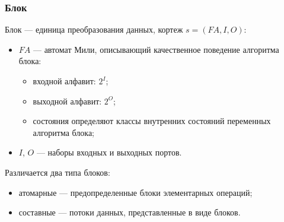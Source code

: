 \documentclass[10pt,pdf,hyperref={unicode}]{beamer}
\newcommand{\FA}{F\!A}
\begin{document}
\begin{frame}
  \frametitle{Блок}
  Блок --- единица преобразования данных, кортеж $s = (\FA, I, O)$:
  \begin{itemize}
    \item $\FA$ --- автомат Мили, описывающий качественное поведение алгоритма блока:
      \begin{itemize}
        \item входной алфавит: $2^I$;
        \item выходной алфавит: $2^O$;
        \item состояния определяют классы внутренних состояний переменных
              алгоритма блока;
      \end{itemize}
    \item $I$, $O$ --- наборы входных и выходных портов.
  \end{itemize}
  Различается два типа блоков:
  \begin{itemize}
    \item атомарные --- предопределенные блоки элементарных операций;
    \item составные --- потоки данных, представленные в виде блоков.
  \end{itemize}
\end{frame}
\end{document}
